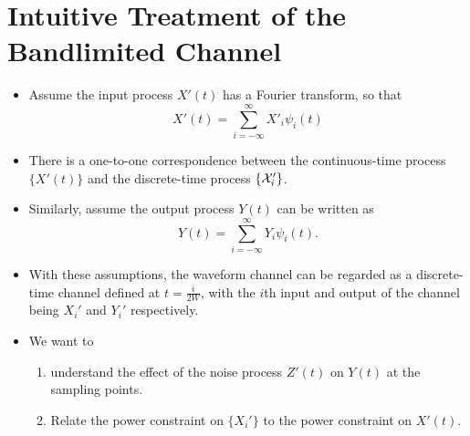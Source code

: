 \documentclass[../main.tex]{subfiles}
\begin{document}
\section{Intuitive Treatment of the Bandlimited Channel}
\begin{itemize}
    \item Assume the input process $X'(t)$ has a Fourier transform, so that \[
    X'(t)=\sum_{i=-\infty}^\infty X'_i\psi_i(t)
    \]
    \item There is a one-to-one correspondence between the continuous-time process $\{X'(t)\}$ and the discrete-time process $\{\mathcal{X}'_i\}$.
    \item Similarly, assume the output process $Y(t)$ can be written as \[
    Y(t)=\sum_{i=-\infty}^\infty Y_i \psi_i(t).
    \]
    \item With these assumptions, the waveform channel can be regarded as a discrete-time channel defined at $t=\frac{i}{2W}$, with the $i$th input and output of the channel being $X_i'$ and $Y_i'$ respectively.
    \item We want to \begin{enumerate}
        \item understand the effect of the noise process $Z'(t)$ on $Y(t)$ at the sampling points.
        \item Relate the power constraint on $\{X_i'\}$ to the power constraint on $X'(t)$.
    \end{enumerate}
\end{itemize}
\end{document}
